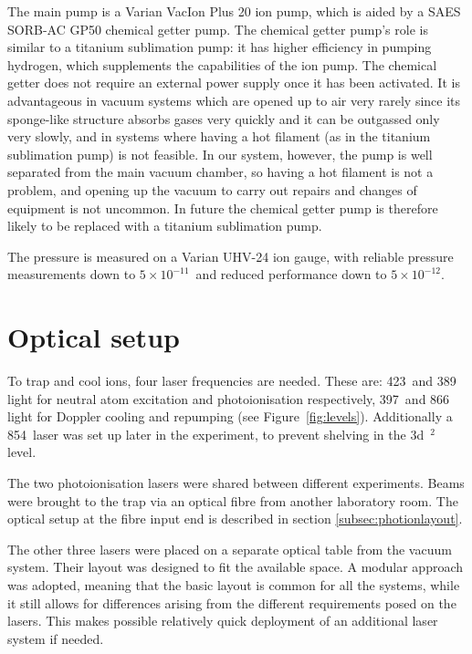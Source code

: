 The main pump is a Varian VacIon Plus 20 ion pump, which is aided by a SAES SORB-AC GP50 chemical getter pump. The chemical getter pump's role is similar to a titanium sublimation pump: it has higher efficiency in pumping hydrogen, which supplements the capabilities of the ion pump. The chemical getter does not require an external power supply once it has been activated. It is advantageous in vacuum systems which are opened up to air very rarely since its sponge-like structure absorbs gases very quickly and it can be outgassed only very slowly, and in systems where having a hot filament (as in the titanium sublimation pump) is not feasible. In our system, however, the pump is well separated from the main vacuum chamber, so having a hot filament is not a problem, and opening up the vacuum to carry out repairs and changes of equipment is not uncommon. In future the chemical getter pump is therefore likely to be replaced with a titanium sublimation pump.

The pressure is measured on a Varian UHV-24 ion gauge, with reliable pressure measurements down to  $5 \times 10^{-11}$\torr\, and reduced performance down to $5 \times 10^{-12}$\torr.


\section{Optical setup}

To trap and cool ions, four laser frequencies are needed. These are: 423\nm\, and 389\nm\, light for neutral atom excitation and photoionisation respectively, 397\nm\, and 866\nm\, light for Doppler cooling and repumping (see Figure~\ref{fig:levels}). Additionally a 854\nm\, laser was set up later in the experiment, to prevent shelving in the 3d~$^2$\dfh\, level.


The two photoionisation lasers were shared between different experiments. Beams were brought to the trap via an optical fibre from another laboratory room. The optical setup at the fibre input end  is described in section \ref{subsec:photionlayout}.

The other three lasers were placed on a separate optical table from the vacuum system. Their layout was designed to fit the available space. A modular approach was adopted, meaning that the basic layout is common for all the systems, while it still allows for differences arising from the different requirements posed on the lasers. This makes possible relatively quick deployment of an additional laser system if needed.

